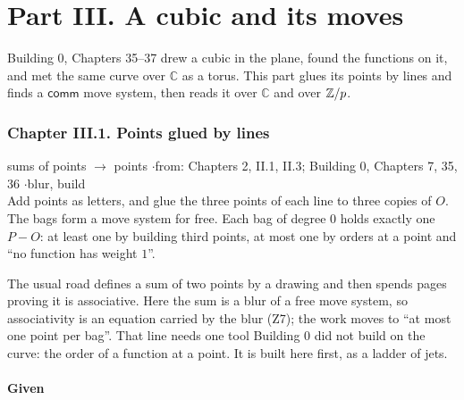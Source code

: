 
\part*{Part III. A cubic and its moves}

Building 0, Chapters 35--37 drew a cubic in the plane, found the functions on it, and met the same curve over $\mathbb{C}$ as a torus. This part glues its points by lines and finds a $\mathsf{comm}$ move system, then reads it over $\mathbb{C}$ and over $\mathbb{Z}/p$.

\section*{Chapter III.1. Points glued by lines}
\begin{center}
{\normalsize sums of points $\to$ points \quad$\cdot$\quad from: Chapters 2, II.1, II.3; Building 0, Chapters 7, 35, 36 \quad$\cdot$\quad blur, build}\\[4pt]
{\small Add points as letters, and glue the three points of each line to three copies of $O$. The bags form a move system for free. Each bag of degree $0$ holds exactly one $P - O$: at least one by building third points, at most one by orders at a point and ``no function has weight $1$''.}
\end{center}

The usual road defines a sum of two points by a drawing and then spends pages proving it is associative. Here the sum is a blur of a free move system, so associativity is an equation carried by the blur (Z7); the work moves to ``at most one point per bag''. That line needs one tool Building 0 did not build on the curve: the order of a function at a point. It is built here first, as a ladder of jets.

\subsection*{Given}

